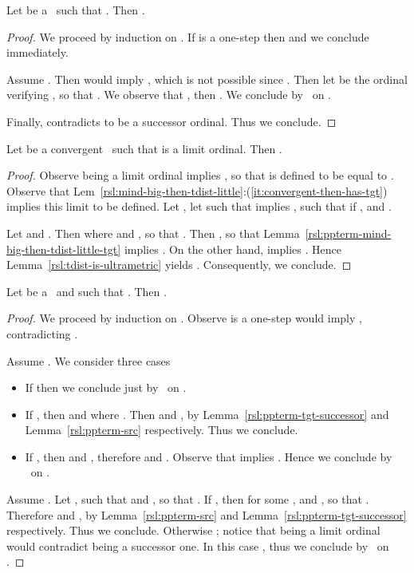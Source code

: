\begin{lemma}
\label{rsl:ppterm-tgt-successor}
Let  be a \ppterm\ such that . Then .
\end{lemma}

\begin{proof}
We proceed by induction on .
If  is a one-step then  and we conclude immediately.

Assume .
Then  would imply , which is not possible since .
Then let  be the ordinal verifying , so that . 
We observe that , then .
We conclude by \ih\ on .

Finally,  contradicts  to be a successor ordinal. Thus we conclude.
\end{proof}


\begin{lemma}
\label{rsl:ppterm-tgt-limit}
Let  be a convergent \ppterm\ such that  is a limit ordinal. 
Then .
\end{lemma}

\begin{proof}
Observe  being a limit ordinal implies 
, so that  is defined to be equal to . Observe that Lem~\ref{rsl:mind-big-then-tdist-little}:(\ref{it:convergent-then-has-tgt}) implies this limit to be defined.
Let , let  such that  implies ,  such that  if , and .

Let  and .
Then  where  and , so that . 
Then , so that Lemma~\ref{rsl:ppterm-mind-big-then-tdist-little-tgt} implies .
On the other hand,  implies .
Hence Lemma~\ref{rsl:tdist-is-ultrametric} yields .
Consequently, we conclude.
\end{proof}


\begin{lemma}
\label{rsl:ppterm-tgt-src-coherence}
Let  be a \ppterm\ and  such that . Then .
\end{lemma}

\begin{proof}
We proceed by induction on . Observe  is a one-step would imply , contradicting .

Assume . We consider three cases
\begin{itemize}
\item 
If  then we conclude just by \ih\ on .
\item
If , then  and  where . 
Then  and , by Lemma~\ref{rsl:ppterm-tgt-successor} and Lemma~\ref{rsl:ppterm-src} respectively. Thus we conclude.
\item
If , then  and , therefore  and . Observe that  implies . Hence we conclude by \ih\ on .
\end{itemize}

Assume . Let ,  such that  and , so that .
If , then  for some , and , so that .
Therefore  and , by Lemma~\ref{rsl:ppterm-src} and Lemma~\ref{rsl:ppterm-tgt-successor} respectively. Thus we conclude.
Otherwise ; notice that  being a limit ordinal would contradict  being a successor one.
In this case , thus we conclude by \ih\ on .
\end{proof}



